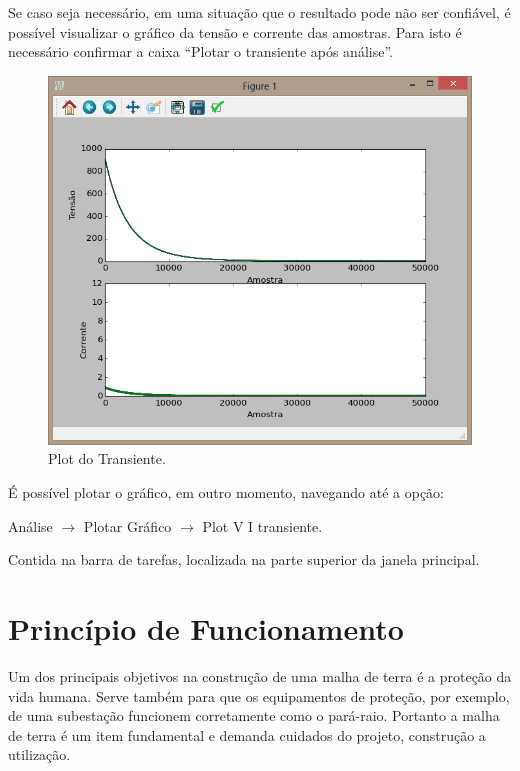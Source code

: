 \documentclass[a4paper, 10pt]{article}
\begin{document}
Se caso seja necessário, em uma situação que o resultado pode não ser confiável, 
é possível visualizar o gráfico da tensão e corrente das amostras. Para isto 
é necessário confirmar a caixa ``Plotar o transiente após análise''.

\begin{figure}[H]
        \caption{\label{fig_plt_transiente}Plot do Transiente.}
	    \begin{center}
            \includegraphics[scale=0.4]{../fotos/execucao/plot_transiente.png}
	    \end{center}
\end{figure}


É possível plotar o gráfico, em outro momento, navegando até a opção:

Análise $\rightarrow$ Plotar Gráfico $\rightarrow$ Plot V I transiente. 

Contida na barra de tarefas, localizada na parte superior da janela principal.


\section{Princípio de Funcionamento}

Um dos principais objetivos na construção de uma malha de terra é a 
proteção da vida humana. Serve também para que os equipamentos de 
proteção, por exemplo, de uma subestação funcionem corretamente como
o pará-raio. Portanto a malha de terra é um item fundamental e 
demanda cuidados do projeto, construção a utilização.
\end{document}
